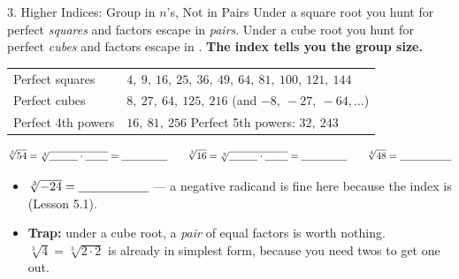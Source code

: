 \documentclass[10pt]{article}
\begin{document}
\begin{notesbox}{3. Higher Indices: Group in $n$'s, Not in Pairs}
Under a square root you hunt for perfect \emph{squares} and factors escape in \emph{pairs}. Under a
cube root you hunt for perfect \emph{cubes} and factors escape in \blank{1.6cm}. \textbf{The index
tells you the group size.}
\begin{center}
\renewcommand{\arraystretch}{1.3}
\begin{tabularx}{\linewidth}{@{}l X@{}}
Perfect squares & $4,\ 9,\ 16,\ 25,\ 36,\ 49,\ 64,\ 81,\ 100,\ 121,\ 144$ \\
Perfect cubes   & $8,\ 27,\ 64,\ 125,\ 216$ \quad (and $-8,\ -27,\ -64,\dots$) \\
Perfect 4th powers & $16,\ 81,\ 256$ \qquad Perfect 5th powers: $32,\ 243$ \\
\end{tabularx}
\end{center}
\[
  \sqrt[3]{54}=\sqrt[3]{\blank{1.0cm}\cdot\blank{0.8cm}}=\blank{1.6cm}
  \qquad
  \sqrt[3]{16}=\sqrt[3]{\blank{1.0cm}\cdot\blank{0.8cm}}=\blank{1.6cm}
  \qquad
  \sqrt[4]{48}=\blank{1.8cm}
\]
\begin{itemize}[leftmargin=1.5em, itemsep=3pt]
  \item $\sqrt[3]{-24}=\blank{2.0cm}$ \quad --- a negative radicand is fine here because the index
        is \blank{1.2cm} (Lesson 5.1).
  \item \textbf{Trap:} under a cube root, a \emph{pair} of equal factors is worth nothing.
        $\sqrt[3]{4}=\sqrt[3]{2\cdot 2}$ is already in simplest form, because you need
        \blank{1.2cm} twos to get one out.
\end{itemize}
\end{notesbox}
\end{document}
